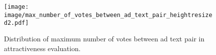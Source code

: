 \begin{figure}[t]
 \centering
  \texttt{[image: image/max\_number\_of\_votes\_between\_ad\_text\_pair\_heightresized2.pdf]}
 \caption{Distribution of maximum number of votes between ad text pair in attractiveness evaluation.}
 \label{fig:dist_of_max_number_votes}
\end{figure}